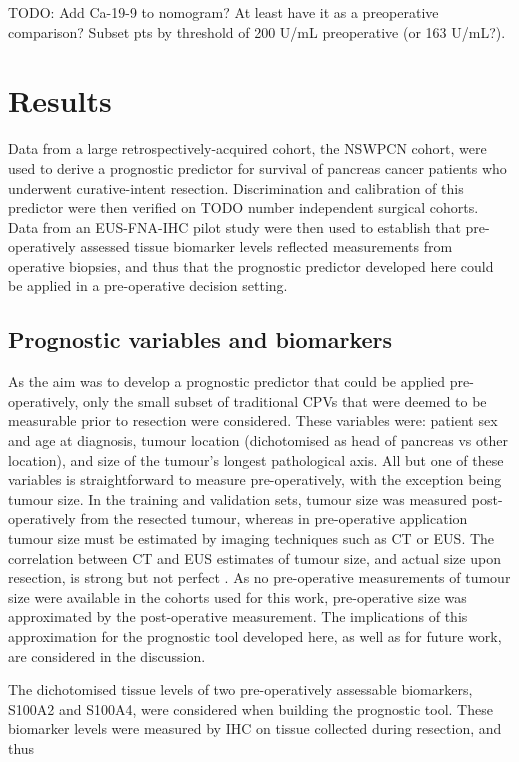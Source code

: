 \documentclass[dissertation.tex]{subfiles}
\begin{document}
TODO: Add Ca-19-9 to nomogram?  At least have it as a preoperative comparison?  Subset pts by threshold of 200 U/mL preoperative (or 163 U/mL?).

\section{Results}
Data from a large retrospectively-acquired cohort, the \gls{NSWPCN} cohort, were used to derive a prognostic predictor for survival of pancreas cancer patients who underwent curative-intent resection.  Discrimination and calibration of this predictor were then verified on TODO number independent surgical cohorts.  Data from an \gls{EUS}-\gls{FNA}-\gls{IHC} pilot study were then used to establish that pre-operatively assessed tissue biomarker levels reflected measurements from operative biopsies, and thus that the prognostic predictor developed here could be applied in a pre-operative decision setting.

\subsection{Prognostic variables and biomarkers}
As the aim was to develop a prognostic predictor that could be applied pre-operatively, only the small subset of traditional \glspl{CPV} that were deemed to be measurable prior to resection were considered.  These variables were: patient sex and age at diagnosis, tumour location (dichotomised as head of pancreas vs other location), and size of the tumour's longest pathological axis.  All but one of these variables is straightforward to measure pre-operatively, with the exception being tumour size.  In the training and validation sets, tumour size was measured post-operatively from the resected tumour, whereas in pre-operative application tumour size must be estimated by imaging techniques such as \gls{CT} or \gls{EUS}.  The correlation between \gls{CT} and \gls{EUS} estimates of tumour size, and actual size upon resection, is strong but not perfect \cite{Arvold2011}.  As no pre-operative measurements of tumour size were available in the cohorts used for this work, pre-operative size was approximated by the post-operative measurement.  The implications of this approximation for the prognostic tool developed here, as well as for future work, are considered in the discussion.

The dichotomised tissue levels of two pre-operatively assessable biomarkers, S100A2 and S100A4, were considered when building the prognostic tool.  These biomarker levels were measured by \gls{IHC} on tissue collected during resection, and thus 
\end{document}
